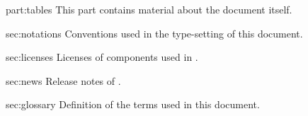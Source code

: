 \begin{partDescription}{part:tables}
  {
    This part contains material about the document itself.
  }
\item[sec:notations]
  Conventions used in the type-setting of this document.

\item[sec:licenses]
  Licenses of components used in \usdk.

\item[sec:news]
  Release notes of \usdk.

\item[sec:glossary]
  Definition of the terms used in this document.

\end{partDescription}


